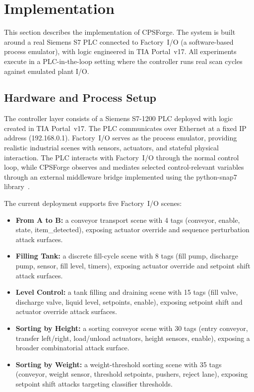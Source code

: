 \section{Implementation}
\label{sec:implementation}

This section describes the implementation of CPSForge. The system is built around a real Siemens S7 PLC connected to Factory~I/O (a software-based process emulator), with logic engineered in TIA Portal~v17. All experiments execute in a PLC-in-the-loop setting where the controller runs real scan cycles against emulated plant I/O.

\subsection{Hardware and Process Setup}

The controller layer consists of a Siemens S7-1200 PLC deployed with logic created in TIA Portal~v17. The PLC communicates over Ethernet at a fixed IP address (192.168.0.1). Factory~I/O serves as the process emulator, providing realistic industrial scenes with sensors, actuators, and stateful physical interaction. The PLC interacts with Factory~I/O through the normal control loop, while CPSForge observes and mediates selected control-relevant variables through an external middleware bridge implemented using the python-snap7 library~\cite{snap7}.

The current deployment supports five Factory~I/O scenes:

\begin{itemize}[leftmargin=1.5em]
    \item \textbf{From A to B:} a conveyor transport scene with 4 tags (conveyor, enable, state, item\_detected), exposing actuator override and sequence perturbation attack surfaces.
    \item \textbf{Filling Tank:} a discrete fill-cycle scene with 8 tags (fill pump, discharge pump, sensor, fill level, timers), exposing actuator override and setpoint shift attack surfaces.
    \item \textbf{Level Control:} a tank filling and draining scene with 15 tags (fill valve, discharge valve, liquid level, setpoints, enable), exposing setpoint shift and actuator override attack surfaces.
    \item \textbf{Sorting by Height:} a sorting conveyor scene with 30 tags (entry conveyor, transfer left/right, load/unload actuators, height sensors, enable), exposing a broader combinatorial attack surface.
    \item \textbf{Sorting by Weight:} a weight-threshold sorting scene with 35 tags (conveyor, weight sensor, threshold setpoints, pushers, reject lane), exposing setpoint shift attacks targeting classifier thresholds.
\end{itemize}

